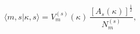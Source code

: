 \begin{equation}
\langle m,s|\kappa,s\rangle=
V_m^{(s)}(\kappa)\,\frac{[A_s(\kappa)]^{\frac{1}{2}}}{N_m^{(s)}},
\label{<mk>}
\end{equation}

